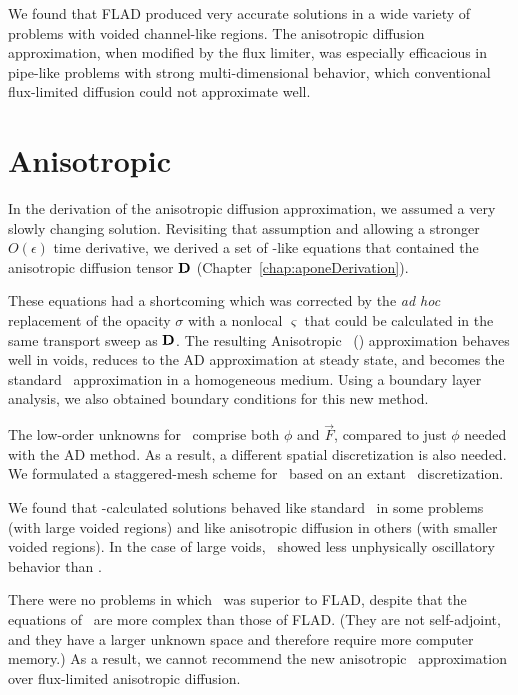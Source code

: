 We found that FLAD produced very accurate solutions in a wide
variety of problems with voided channel-like regions. The anisotropic diffusion
approximation, when modified by the flux limiter, was especially efficacious in
pipe-like problems with strong multi-dimensional behavior, which conventional
flux-limited diffusion could not approximate well.

\section{Anisotropic \texorpdfstring{\Pone}{P1}}

In the derivation of the anisotropic diffusion approximation, we assumed a very
slowly changing solution. Revisiting that assumption and allowing a stronger
$O(\epsilon)$ time derivative, we
derived a set of \Pone-like equations that contained the anisotropic diffusion
tensor $\mathbf{D}$ (Chapter~\ref{chap:aponeDerivation}). 

These equations
had a shortcoming which was corrected by the \emph{ad hoc} replacement of the
opacity $\sigma$ with a nonlocal $\varsigma$ that could be
calculated in the same transport sweep as $\mathbf{D}$. The resulting Anisotropic
\Pone\ (\APone) approximation behaves well in voids, reduces to the AD
approximation at steady state, and becomes the standard \Pone\ approximation in
a homogeneous medium.
Using a boundary layer analysis, we also obtained boundary conditions for this
new method.

The low-order unknowns for \APone\ comprise both $\phi$ and $\vec{F}$, compared
to just $\phi$ needed with the AD method.  As a result, a different spatial
discretization is also needed. We formulated a staggered-mesh
scheme for \APone\ based on an extant \Pone\ discretization.

We found that \APone-calculated solutions behaved like standard \Pone\ in some
problems (with large voided regions) and like anisotropic diffusion in others
(with smaller voided regions). In the case of large voids, \APone\ showed less
unphysically oscillatory behavior than \Pone.

There were no problems in which \APone\ was superior to FLAD,
despite that the equations of \APone\ are more complex than those of FLAD. (They
are not
self-adjoint, and they have a larger unknown space and therefore require more
computer memory.)
As a result, we cannot recommend the new anisotropic \Pone\ approximation over
flux-limited anisotropic diffusion.

